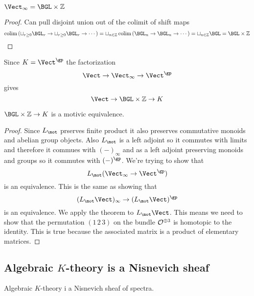 \documentclass[12pt]{article}
\begin{document}
\begin{prop}
$\Vect_\infty = \BGL \times \Z$
\end{prop}

\begin{proof}
Can pull disjoint union out of the colimit of shift maps
\[ \colim{\left( \sqcup_{r \ge 0} \BGL_r \to \sqcup_{r \ge 0} \BGL_r \to \cdots \right)} = \sqcup_{n \in \ZZ} \colim{(\BGL_n \to \BGL_n \to \cdots)} = \sqcup_{n \in \Z} \BGL = \BGL \times \Z \]
\end{proof}

Since $K = \Vect^{\gp}$ the factorization
\[ \Vect \to \Vect_{\infty} \to \Vect^{\gp} \]
gives
\[ \Vect \to \BGL \times \Z \to K \]

\begin{theorem}
$\BGL \times \Z \to K$ is a motivic equivalence. 
\end{theorem}

\begin{proof}
Since $L_{\mot}$ prserves finite product it also preserves commutative monoids and abelian group objects. Also $L_{\mot}$ is a left adjoint so it commutes with limits and therefore it commues with $(-)_{\infty}$ and as a left adjoint preserving monoids and groups so it commutes with $(-)^{\gp}$. We're trying to show that
\[ L_{\mot} (\Vect_\infty \to \Vect^{\gp}) \]
is an equivalence. This is the same as showing that
\[ (L_{\mot} \Vect)_{\infty} \to (L_{\mot} \Vect)^{\gp} \]
is an equivalence. We apply the theorem to $L_{\mot} \Vect$. This means we need to show that the permutation $(1 \, 2 \, 3)$ on the bundle $\mathcal{O}_{}^{\oplus 3}$ is homotopic to the identity. This is true because the associated matrix is a product of elementary matrices. 
\end{proof}

\subsection{Algebraic $K$-theory is a Nisnevich sheaf}

\begin{theorem}
Algebraic $K$-theory i a Nisnevich sheaf of spectra. 
\end{theorem}
\end{document}
